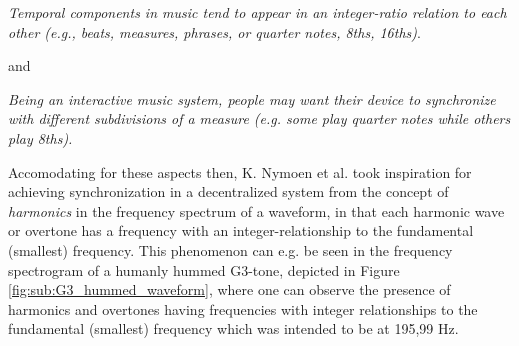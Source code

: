 		\textit{Temporal components in music tend to appear in an integer-ratio relation to each other (e.g., beats, measures, phrases, or quarter notes, 8ths, 16ths)}. \nl

		and \nl

		\textit{Being an interactive music system, people may want their device to synchronize with different subdivisions of a measure (e.g. some play quarter notes while others play 8ths).} \nl

		Accomodating for these aspects then, K. Nymoen et al. took inspiration for achieving synchronization in a decentralized system from the concept of \textit{harmonics} in the frequency spectrum of a waveform, in that each harmonic wave or overtone has a frequency with an integer-relationship to the fundamental (smallest) frequency. This phenomenon can e.g. be seen in the frequency spectrogram of a humanly hummed G3-tone, depicted in Figure \ref{fig:sub:G3_hummed_waveform}, where one can observe the presence of harmonics and overtones having frequencies with integer relationships to the fundamental (smallest) frequency which was intended to be at 195,99 Hz.

